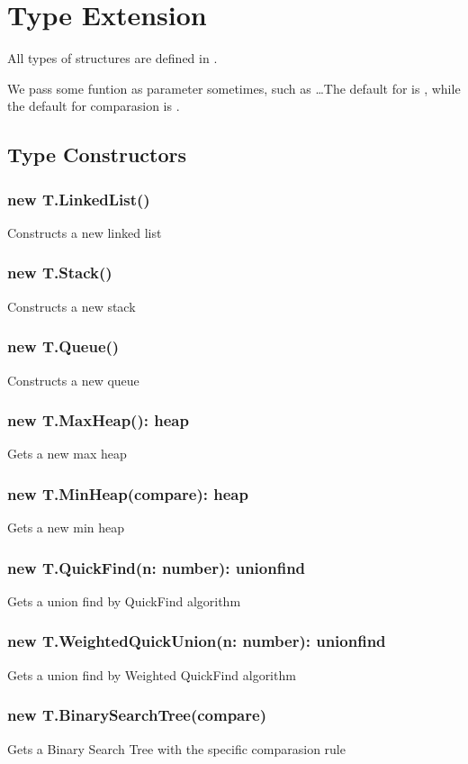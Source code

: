 \section{Type Extension}
All types of structures are defined in .

We pass some funtion as parameter sometimes, such as  \ldots The default  for  is , while the default for comparasion is .

\subsection{Type Constructors}
\subsubsection*{new T.LinkedList()}
Constructs a new linked list
\subsubsection*{new T.Stack()}
Constructs a new stack
\subsubsection*{new T.Queue()}
Constructs a new queue
\subsubsection*{new T.MaxHeap(): heap}
Gets a new max heap
\subsubsection*{new T.MinHeap(compare): heap}
Gets a new min heap
\subsubsection*{new T.QuickFind(n: number): unionfind}
Gets a union find by QuickFind algorithm
\subsubsection*{new T.WeightedQuickUnion(n: number): unionfind}
Gets a union find by Weighted QuickFind algorithm
\subsubsection*{new T.BinarySearchTree(compare)}
Gets a Binary Search Tree with the specific comparasion rule
